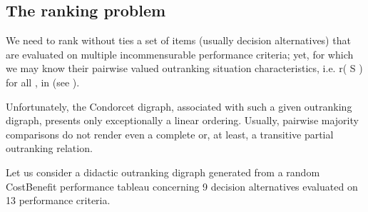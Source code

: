 \documentclass[a4paper,10pt,english]{sphinxhowto}
\begin{document}
\subsection{The ranking problem}
\label{\detokenize{tutorial:the-ranking-problem}}
We need to rank without ties a set  of items (usually decision alternatives) that are evaluated on multiple incommensurable performance criteria; yet, for which we may know their pairwise valued outranking situation characteristics, i.e. r( S ) for all ,  in  (see ).

Unfortunately, the Condorcet digraph, associated with such a given outranking digraph, presents only exceptionally a linear ordering. Usually, pairwise majority comparisons do not render even a complete or, at least, a transitive partial outranking relation.

Let us consider a didactic outranking digraph generated from a random Cost\sphinxhyphen{}Benefit performance tableau concerning 9 decision alternatives evaluated on 13 performance criteria.
\end{document}
